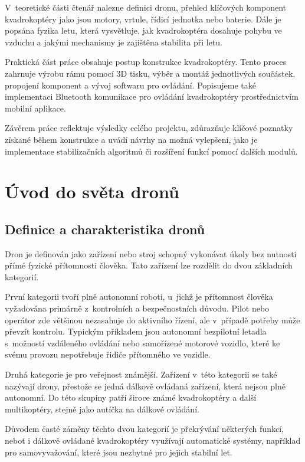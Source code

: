 \documentclass[12pt]{report}
\begin{document}
V~teoretické části čtenář nalezne definici dronu, přehled klíčových komponent kvadrokoptéry jako jsou motory, vrtule, řídicí jednotka nebo baterie. Dále je popsána fyzika letu, která vysvětluje, jak kvadrokoptéra dosahuje pohybu ve vzduchu a jakými mechanismy je zajištěna stabilita při letu.

Praktická část práce obsahuje postup konstrukce kvadrokoptéry. Tento proces zahrnuje výrobu rámu pomocí 3D tisku, výběr a montáž jednotlivých součástek, propojení komponent a vývoj softwaru pro ovládání. Popisujeme také implementaci Bluetooth komunikace pro ovládání kvadrokoptéry prostřednictvím mobilní aplikace.

Závěrem práce reflektuje výsledky celého projektu, zdůrazňuje klíčové poznatky získané během konstrukce a uvádí návrhy na možná vylepšení, jako je implementace stabilizačních algoritmů či rozšíření funkcí pomocí dalších modulů.
\part[Úvod do světa dronů]{Úvod do světa dronů}  %

\chapter[Definice a charakteristika dronů]{Definice a charakteristika dronů}

Dron je definován jako zařízení nebo stroj schopný vykonávat úkoly bez nutnosti přímé fyzické přítomnosti člověka. Tato zařízení lze rozdělit do dvou základních kategorií.

První kategorii tvoří plně autonomní roboti, u~jichž je přítomnost člověka vyžadována primárně z~kontrolních a bezpečnostních důvodu. Pilot nebo operátor zde většinou nezasahuje do aktivního řízení, ale v~případě potřeby může převzít kontrolu. Typickým příkladem jsou autonomní bezpilotní letadla s~možností vzdáleného ovládání nebo samořízené motorové vozidlo, které ke svému provozu nepotřebuje řidiče přítomného ve vozidle.

Druhá kategorie je pro veřejnost známější. Zařízení v~této kategorii se také nazývají drony, přestože se jedná dálkově ovládaná zařízení, která nejsou plně autonomní. Do této skupiny patří široce známé kvadrokoptéry a další multikoptéry, stejně jako autíčka na dálkové ovládání.

Důvodem časté záměny těchto dvou kategorií je překrývání některých funkcí, neboť i dálkově ovládané kvadrokoptéry využívají automatické systémy, například pro samovyvažování, které jsou nezbytné pro jejich stabilní let.\cite{mainbook}
\end{document}
